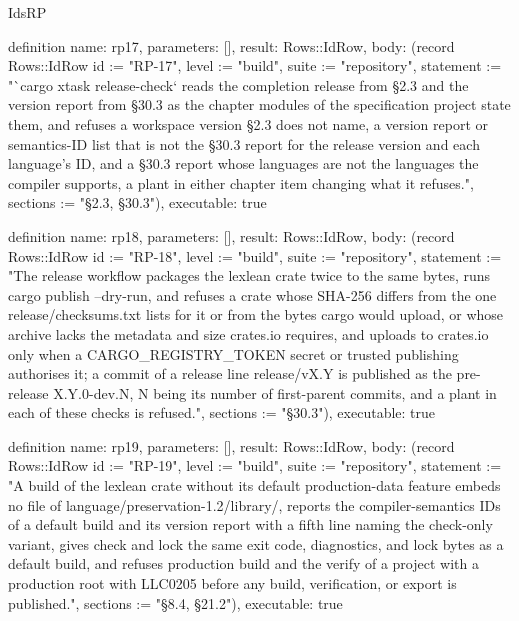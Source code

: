 \begin{lexlean}{IdsRP}
\begin{semanticmodule}
definition{
  name: rp17,
  parameters: [],
  result: Rows::IdRow,
  body: (record Rows::IdRow {id := "RP-17", level := "build", suite := "repository", statement := "`cargo xtask release-check` reads the completion release from §2.3 and the version report from §30.3 as the chapter modules of the specification project state them, and refuses a workspace version §2.3 does not name, a version report or semantics-ID list that is not the §30.3 report for the release version and each language's ID, and a §30.3 report whose languages are not the languages the compiler supports, a plant in either chapter item changing what it refuses.", sections := "§2.3, §30.3"}),
  executable: true
}

definition{
  name: rp18,
  parameters: [],
  result: Rows::IdRow,
  body: (record Rows::IdRow {id := "RP-18", level := "build", suite := "repository", statement := "The release workflow packages the lexlean crate twice to the same bytes, runs cargo publish --dry-run, and refuses a crate whose SHA-256 differs from the one release/checksums.txt lists for it or from the bytes cargo would upload, or whose archive lacks the metadata and size crates.io requires, and uploads to crates.io only when a CARGO_REGISTRY_TOKEN secret or trusted publishing authorises it; a commit of a release line release/vX.Y is published as the pre-release X.Y.0-dev.N, N being its number of first-parent commits, and a plant in each of these checks is refused.", sections := "§30.3"}),
  executable: true
}

definition{
  name: rp19,
  parameters: [],
  result: Rows::IdRow,
  body: (record Rows::IdRow {id := "RP-19", level := "build", suite := "repository", statement := "A build of the lexlean crate without its default production-data feature embeds no file of language/preservation-1.2/library/, reports the compiler-semantics IDs of a default build and its version report with a fifth line naming the check-only variant, gives check and lock the same exit code, diagnostics, and lock bytes as a default build, and refuses production build and the verify of a project with a production root with LLC0205 before any build, verification, or export is published.", sections := "§8.4, §21.2"}),
  executable: true
}
\end{semanticmodule}
\end{lexlean}
